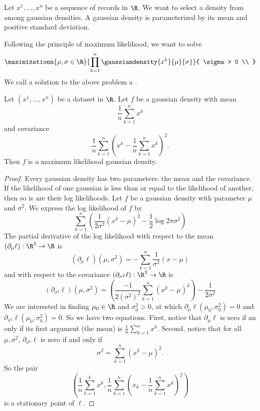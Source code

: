 


Let $x^1, \dots, x^n$ be a sequence
of records in $\R$.
We want to select a density from
among gaussian densities.
A gaussian density is parameterized
by its mean and positive standard deviation.

Following the principle of maximum likelihood,
we want to solve
\[
  \maximizationn{\mu,\sigma \in \R}{
    \prod_{k = 1}^{n}  \gaussiandensity{x^k}{\mu}{\sigma}
  }{
    \sigma > 0 \\
  }
\]
We call a solution to the above problem
a .


\begin{prop}
Let $(x^1, \dots, x^n)$ be a dataset in $\R$.
Let $f$ be a gaussian density with mean
$$\frac{1}{n} \sum_{k = 1}^{n} x^k$$
and covariance
$$\frac{1}{n} \sum_{k = 1}^{n} \left(x^k - \frac{1}{n} \sum_{k = 1}^{n} x^k\right)^2.$$
Then $f$ is a maximum likelihood gaussian density.
\begin{proof}
  Every gaussian density has two parameters: the mean
  and the covariance.
  If the likelihood of one gaussian is less than or equal
  to the likelihood of another, then so is are their
  log likelihoods.
  Let $f$ be a gaussian density with parameter $\mu$ and $\sigma^2$.
  We express the log likelihood of
  $f$ by
  \[
    \sum_{k = 1}^{n} \left( \frac{1}{2\sigma^2}(x^k - \mu)^2 - \frac{1}{2}\log2\pi\sigma^2\right)
  \]
  The partial derivative of the log likelihood with
  respect to the mean $(\partial_{\mu} \ell): \R^2 \to \R$ is
  \[
    (\partial_\mu \ell)(\mu, \sigma^2) = - \sum_{k = 1}^{n} \frac{1}{\sigma^2}(x - \mu)
  \]
  and with respect to the covariance $(\partial_{\sigma^2} \ell): \R^2 \to \R$ is
  \[
    (\partial_{\sigma^2} \ell)(\mu, \sigma^2) =
    \left(\frac{-1}{2(\sigma^2)^{2}}\sum_{k = 1}^{n}(x^k - \mu)^2\right)- \frac{1}{2\sigma^2}
  \]
  We are interested in finding $\mu_0 \in \R$ and $\sigma^2_0 > 0$, at which
  $\partial_\mu \ell(\mu_0, \sigma^2_0) = 0$ and
  $\partial_{\sigma^2} \ell(\mu_0, \sigma^2_0) = 0$.
  So we have two equations.
  First, notice that
  $\partial_\mu \ell$ is zero if an only if
  its first argument (the mean) is $\frac{1}{n} \sum_{k = 1}^{n} x^k$.
  Second, notice that for all $\mu, \sigma^2$,
  $\partial_{\sigma^2}\ell$ is zero if and only if
  \[
    \sigma^2 = \sum_{k = 1}^{n} (x^k - \mu)^2.
  \]
  So the pair
  \[
    \left(\frac{1}{n}\sum_{k = 1}^{k} x^k, \frac{1}{n} \sum_{k = 1}^{n} (x_k - \frac{1}{n} \sum_{k = 1}^{n}  x^k)^2\right)
  \]
  is a stationary point of $\ell$.
\end{proof}
\end{prop}
